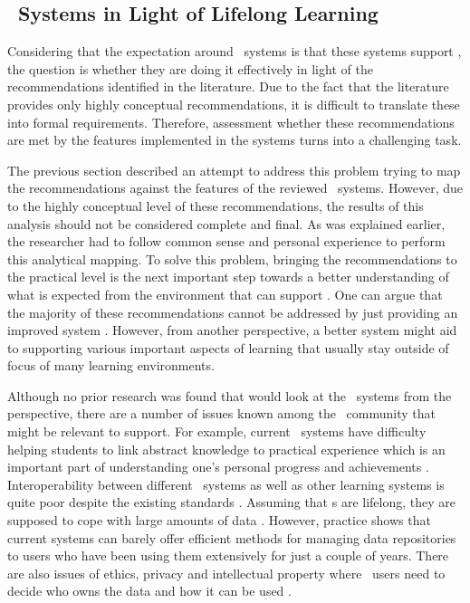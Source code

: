 \subsection{\ep~Systems in Light of Lifelong Learning}

Considering that the expectation around \ep~systems is that these systems
support \LLLsn, the question is whether they are doing it effectively in light
of the recommendations identified in the literature. Due to the fact that the
literature provides only highly conceptual recommendations, it is difficult to
translate these into formal requirements. Therefore, assessment whether these
recommendations are met by the features implemented in the systems turns into a
challenging task. 

The previous section described an attempt to address this problem trying to map
the recommendations against the features of the reviewed \ep~systems. However,
due to the highly conceptual level of these recommendations, the results of this
analysis should not be considered complete and final. As was explained earlier,
the researcher had to follow common sense and personal experience to perform
this analytical mapping. To solve this problem, bringing the recommendations to
the practical level is the next important step towards a better understanding of
what is expected from the environment that can support \LLLsn. One can argue
that the majority of these recommendations cannot be addressed by just providing
an improved system \citep{Schaffert2008}. However, from another perspective, a
better system might aid to supporting various important aspects of learning that
usually stay outside of focus of many learning environments.

Although no prior research was found that would look at the \ep~systems from the
\LLLs perspective, there are a number of issues known among the \ep~community
that might be relevant to \LLLs support. For example, current \ep~systems have
difficulty helping students to link abstract knowledge to practical experience
which is an important part of understanding one's personal progress and
achievements \citep{Chou2009}. Interoperability between different \ep~systems as
well as other learning systems is quite poor despite the existing standards
\citep{Clark2011}. Assuming that \ep s are lifelong, they are supposed to cope
with large amounts of data \citep{Butler2010}. However, practice shows that
current systems can barely offer efficient methods for managing data
repositories to users who have been using them extensively for just a couple of
years. There are also issues of ethics, privacy and intellectual property where
\ep~users need to decide who owns the data and how it can be used
\citep{Challis2005}.

